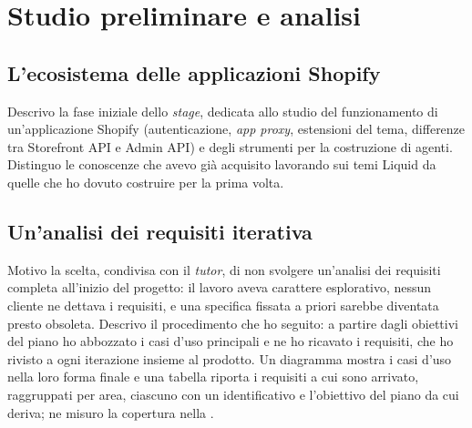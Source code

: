 
\section{Studio preliminare e analisi}

\subsection{L’ecosistema delle applicazioni Shopify}
\label{sec:ecosistema-applicazioni}

Descrivo la fase iniziale dello \emph{stage}, dedicata allo studio del funzionamento di
un’applicazione Shopify (autenticazione, \emph{app proxy}, estensioni del tema, differenze tra
Storefront API e Admin API) e degli strumenti per la costruzione di agenti. Distinguo le conoscenze
che avevo già acquisito lavorando sui temi Liquid da quelle che ho dovuto costruire per la prima
volta.

\subsection{Un’analisi dei requisiti iterativa}
\label{sec:requisiti}

Motivo la scelta, condivisa con il \emph{tutor}, di non svolgere un’analisi dei requisiti completa
all’inizio del progetto: il lavoro aveva carattere esplorativo, nessun cliente ne dettava i
requisiti, e una specifica fissata a priori sarebbe diventata presto obsoleta. Descrivo il
procedimento che ho seguito: a partire dagli obiettivi del piano ho abbozzato i casi d’uso
principali e ne ho ricavato i requisiti, che ho rivisto a ogni iterazione insieme al prodotto. Un
diagramma mostra i casi d’uso nella loro forma finale e una tabella riporta i requisiti a cui sono
arrivato, raggruppati per area, ciascuno con un identificativo e l’obiettivo del piano da cui
deriva; ne misuro la copertura nella .

